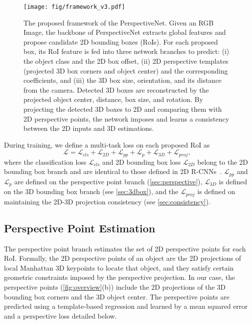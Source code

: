 \documentclass{article}
\begin{document}
\begin{figure}[t!]
    \begin{center}
        \texttt{[image: fig/framework\_v3.pdf]}
    \end{center}
    \vspace{-6pt}
    \caption{The proposed framework of the PerspectiveNet. Given an RGB Image, the backbone of PerspectiveNet extracts global features and propose candidate 2D bounding boxes (RoIs). For each proposed box, its RoI feature is fed into three network branches to predict: (i) the object class and the 2D box offset, (ii) 2D perspective templates (projected 3D box corners and object center) and the corresponding coefficients, and (iii) the 3D box size, orientation, and its distance from the camera. Detected 3D boxes are reconstructed by the projected object center, distance, box size, and rotation. By projecting the detected 3D boxes to 2D and comparing them with 2D perspective points, the network imposes and learns a consistency between the 2D inputs and 3D estimations.}
    \label{fig:framework}
    \vspace{6pt}
\end{figure}

During training, we define a multi-task loss on each proposed RoI as
\begin{equation}
    \mathcal{L} = \mathcal{L}_{cls} + \mathcal{L}_{2D} + \mathcal{L}_{pp} + \mathcal{L}_{p} + \mathcal{L}_{3D} + \mathcal{L}_{proj},
\end{equation}
where the classification loss $\mathcal{L}_{cls}$ and 2D bounding box loss $\mathcal{L}_{2D}$ belong to the 2D bounding box branch and are identical to those defined in 2D R-CNNs~\cite{ren2015faster,he2017mask}. $\mathcal{L}_{pp}$ and $\mathcal{L}_{p}$ are defined on the perspective point branch (\autoref{sec:perspective}), $\mathcal{L}_{3D}$ is defined on the 3D bounding box branch (see \autoref{sec:3dbox}), and the $\mathcal{L}_{proj}$ is defined on maintaining the 2D-3D projection consistency (see \autoref{sec:consistency}).


\subsection{Perspective Point Estimation}
\label{sec:perspective}

The perspective point branch estimates the set of 2D perspective points for each RoI. Formally, the 2D perspective points of an object are the 2D projections of local Manhattan 3D keypoints to locate that object, and they satisfy certain geometric constraints imposed by the perspective projection. In our case, the perspective points (\autoref{fig:overview}(b)) include the 2D projections of the 3D bounding box corners and the 3D object center. The perspective points are predicted using a template-based regression and learned by a mean squared error and a perspective loss detailed below.
\end{document}

